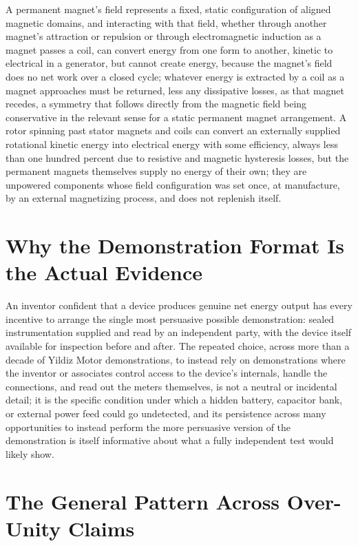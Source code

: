 \documentclass[11pt]{article}
\begin{document}
A permanent magnet's field represents a fixed, static configuration of aligned magnetic domains, and interacting with that field, whether through another magnet's attraction or repulsion or through electromagnetic induction as a magnet passes a coil, can convert energy from one form to another, kinetic to electrical in a generator, but cannot create energy, because the magnet's field does no net work over a closed cycle; whatever energy is extracted by a coil as a magnet approaches must be returned, less any dissipative losses, as that magnet recedes, a symmetry that follows directly from the magnetic field being conservative in the relevant sense for a static permanent magnet arrangement. A rotor spinning past stator magnets and coils can convert an externally supplied rotational kinetic energy into electrical energy with some efficiency, always less than one hundred percent due to resistive and magnetic hysteresis losses, but the permanent magnets themselves supply no energy of their own; they are unpowered components whose field configuration was set once, at manufacture, by an external magnetizing process, and does not replenish itself.

\section{Why the Demonstration Format Is the Actual Evidence}

An inventor confident that a device produces genuine net energy output has every incentive to arrange the single most persuasive possible demonstration: sealed instrumentation supplied and read by an independent party, with the device itself available for inspection before and after. The repeated choice, across more than a decade of Yildiz Motor demonstrations, to instead rely on demonstrations where the inventor or associates control access to the device's internals, handle the connections, and read out the meters themselves, is not a neutral or incidental detail; it is the specific condition under which a hidden battery, capacitor bank, or external power feed could go undetected, and its persistence across many opportunities to instead perform the more persuasive version of the demonstration is itself informative about what a fully independent test would likely show.

\section{The General Pattern Across Over-Unity Claims}
\end{document}
